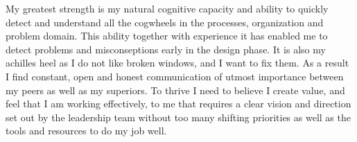 \newline\newline
My greatest strength is my natural cognitive capacity and ability to quickly detect and understand all the cogwheels in the processes, organization and problem domain. This ability together with experience it has enabled me to detect problems and misconseptions early in the design phase. It is also my achilles heel as I do not like broken windows, and I want to fix them.
\newline\newline
As a result I find constant, open and honest communication of utmost importance between my peers as well as my superiors. 
\newline\newline
To thrive I need to believe I create value, and feel that I am working effectively, to me that requires a clear vision and direction set out by the leadership team without too many shifting priorities as well as the tools and resources to do my job well.

